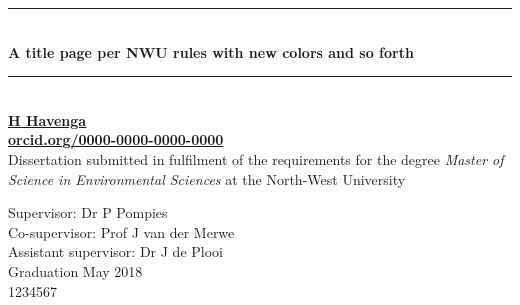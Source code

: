 
\begin{titlepage}
\begingroup
{\selectfont 


\newcommand{\HRule}{\rule{\linewidth}{0.0mm}} %
\center %

\HRule \\[0.5cm]
{\fontsize{32}{10}\selectfont \bfseries A title page per NWU rules with new colors and
so forth}\\[0.2cm] 
\HRule \\[1.25cm]

{\huge \bfseries \href{www.hennohavenga.com}{H Havenga}} \\[0.2cm]
{\huge \bfseries
\href{https://orcid.org/0000-0000-0000-0000}{orcid.org/0000-0000-0000-0000}}
\\[2.20cm]

{\LARGE Dissertation submitted in fulfilment of the requirements for
the degree {\color{cyan!85} \textit{Master of Science in Environmental
Sciences}} at the North-West University}\\[1.70cm]

\raggedright 
\LARGE Supervisor: \hspace{24mm} Dr P Pompies \\
\LARGE Co-supervisor: \hspace{16mm} Prof J van der Merwe \\
\LARGE Assistant supervisor: \hspace{1.4mm} Dr J de Plooi \\[1.5cm]

\LARGE Graduation May 2018\\
\LARGE 1234567\\

\vspace*{2cm}
\noindent
\begin{center}
\end{center}

}
\endgroup
\end{titlepage}

\restoregeometry
